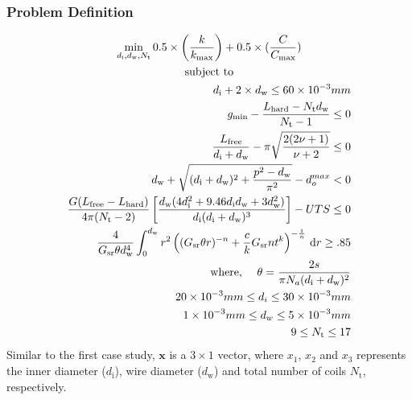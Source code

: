 \documentclass[10pt]{article}
\begin{document}
	\subsubsection{Problem Definition}
	\vspace{-.2in}
	\begin{equation}
					\begin{gathered}
	 					\min_{d_{\text{i}}, d_{\text{w}}, N_{\text{t}}} 0.5 \times\left(\frac{k}{k_{\text{max}}}\right) + 0.5 \times (\frac{C}{C_{\text{max}}}) \\
	 					\mbox{subject to} \\%
						\begin{split}
							 d_{\text{i}} + 2 \times d_{\text{w}} \leq 60 \times 10^{-3} mm\\
							 g_{\text{min}} - \dfrac{L_{\text{hard}} - N_{\text{t}}d_{\text{w}}}{N_{\text{t}}-1} \leq 0\\
							 \frac{L_{\text{free}}}{d_{\text{i}} + d_{\text{w}}} - \pi \sqrt{\frac{2(2 \nu + 1)}{\nu + 2}} \leq 0\\
							 d_{\text{w}} + \sqrt{(d_{\text{i}} + d_{\text{w}})^{2} + \frac{p^{2} - d_{\text{w}}}{\pi^{2}}} - d_{o}^{max} < 0\\
							 \frac{G(L_{\text{free}} - L_{\text{hard}})}{4 \pi (N_{\text{t}} - 2) } \left[\frac{d_{\text{w}} (4d_{\text{i}}^{2} + 9.46d_{\text{i}} d_{\text{w}} + 3 d_{\text{w}}^{2})}{d_{\text{i}}(d_{\text{i}}+d_{\text{w}})^{3}}\right] - UTS \leq 0\\
							 \frac{4}{G_{\text{sr}}\theta d_{\text{w}}^{4}}\int_0^{d_{\text{w}}} r^2 \left( (G_{\text{sr}}\theta r)^{-n} + \frac{c}{k} G_{\text{sr}}nt^k \right)^{-\frac{1}{n}} \,\mathrm{d} r \ge .85\\
							 \mbox{where, } \quad
							  \theta = {2s\over \pi N_a (d_{\text{i}}+d_{\text{w}})^2}\\
							 20 \times 10 ^{-3} mm \leq d_{i} \leq 30 \times 10^{-3} mm\\	 
							 1 \times 10^{-3} mm \leq d_{w} \leq 5 \times 10^{-3} mm\\	 
							 9 \leq N_{\text{t}} \leq 17\\	 
						\end{split}
					\end{gathered}
					\label{eq:Case_2_Problem_Definition}	
				\end{equation}
Similar to the first case study, $\textbf{x}$ is a $3 \times 1$ vector, where $x_{1}$, $x_{2}$ and $x_{3}$ represents the inner diameter ($d_{\text{i}}$), wire diameter ($d_{\text{w}}$) and total number of coils $N_{\text{t}}$, respectively.
\end{document}
